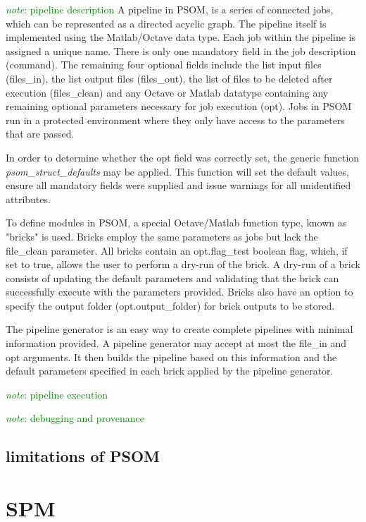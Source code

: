 \documentclass{report}
\newcommand{\note}[1]{\textcolor{green}{\textit{note}: #1}}
\begin{document}
        \note{pipeline description}
        A pipeline in PSOM, is a series of connected jobs, which can be
represented as a directed acyclic graph. The pipeline itself is implemented 
using the Matlab/Octave data type. Each job within the pipeline
is assigned a unique name. There is only one mandatory field in the job
description (command). The remaining four optional fields include the list input
files (files_in), the list output files (files_out), the list of files to be
deleted after execution (files_clean) and any Octave or Matlab datatype
containing any remaining optional parameters necessary for job execution (opt).
Jobs in PSOM run in a protected environment where they only have access to the
parameters that are passed. 

        In order to determine whether the opt field was correctly set, the
generic function \textit{psom_struct_defaults} may be applied. This function
will set the default values, ensure all mandatory fields were supplied and issue
warnings for all unidentified attributes.

        To define modules in PSOM, a special Octave/Matlab function type, known as "bricks"
is used. Bricks employ the same parameters as jobs but lack the file_clean
parameter. All bricks contain an opt.flag_test boolean flag, which, if set to
true, allows the user to perform a dry-run of the brick. A dry-run of a brick
consists of updating the default parameters and validating that the brick can
successfully execute with the parameters provided. Bricks also have an option to
specify the output folder (opt.output_folder) for brick outputs to be stored.

        The pipeline generator is an easy way to create complete pipelines with
minimal information provided. A pipeline generator may accept at most the
file_in and opt arguments. It then builds the pipeline based on this
information and the default parameters specified in each brick applied by the
pipeline generator.

        \note{pipeline execution}



        \note{debugging and provenance}

       
        \subsection{limitations of PSOM}
    \section{SPM} 
\end{document}
